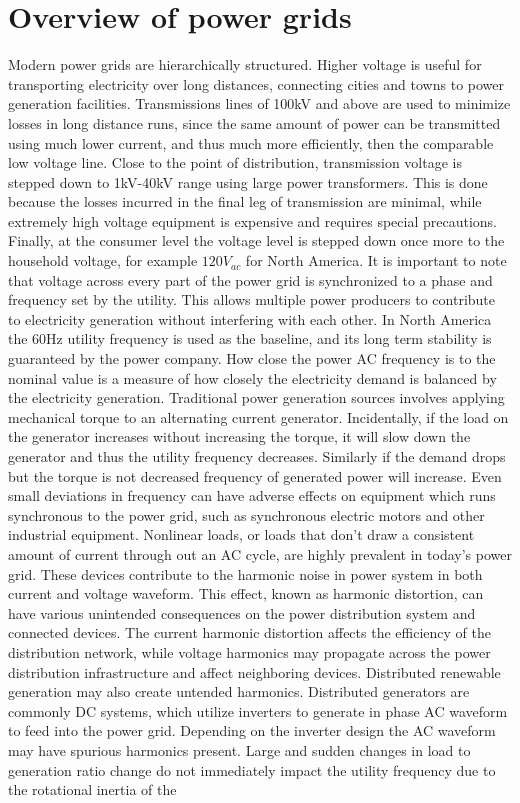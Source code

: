 \section{Overview of power grids}
Modern power grids are hierarchically structured. Higher voltage is useful for transporting electricity over long distances, connecting cities and towns to power generation facilities. Transmissions lines of 100kV and above are used to minimize losses in long distance runs, since the same amount of power can be transmitted using much lower current, and thus much more efficiently, then the comparable low voltage line. Close to the point of distribution, transmission voltage is stepped down to 1kV-40kV range using large power transformers. This is done because the losses incurred in the final leg of transmission are minimal, while extremely high voltage equipment is expensive and requires special precautions.\cite{sivanagaraju2008electric} Finally, at the consumer level the voltage level is stepped down once more to the household voltage, for example $120V_{ac}$ for North America. It is important to note that voltage across every part of the power grid is synchronized to a phase and frequency set by the utility. This allows multiple power producers to contribute to electricity generation without interfering with each other.\cite{blaabjerg2006overview} In North America the 60Hz utility frequency is used as the baseline, and its long term stability is guaranteed by the power company. How close the power AC frequency is to the nominal value is a measure of how closely the electricity demand is balanced by the electricity generation. Traditional power generation sources involves applying mechanical torque to an alternating current generator. Incidentally, if the load on the generator increases without increasing the torque, it will slow down the generator and thus the utility frequency decreases. Similarly if the demand drops but the torque is not decreased frequency of generated power will increase. Even small deviations in frequency can have adverse effects on equipment which runs synchronous to the power grid, such as synchronous electric motors and other industrial equipment.\cite{morren2006wind} Nonlinear loads, or loads that don't draw a consistent amount of current through out an AC cycle, are highly prevalent in today's power grid. These devices contribute to the harmonic noise in power system in both current and voltage waveform. This effect, known as harmonic distortion, can have various unintended consequences on the power distribution system and connected devices. The current harmonic distortion affects the efficiency of the distribution network, while voltage harmonics may propagate across the power distribution infrastructure and affect neighboring devices.\cite{muhamad2007effects} Distributed renewable generation may also create untended harmonics. Distributed generators are commonly DC systems, which utilize inverters to generate in phase AC waveform to feed into the power grid. Depending on the inverter design the AC waveform may have spurious harmonics present.\cite{morren2006wind} Large and sudden changes in load to generation ratio change do not immediately impact the utility frequency due to the rotational inertia of the 